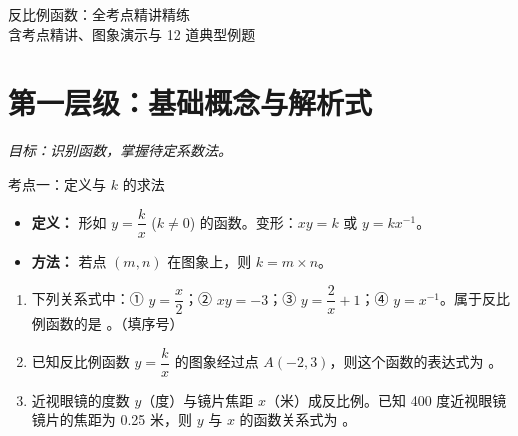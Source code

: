 \documentclass[12pt, a4paper]{article}
\begin{document}
\begin{center}
    { \heiti 反比例函数：全考点精讲精练} \\
    \vspace{0.1cm}
    {\large \kaishu 含考点精讲、图象演示与 12 道典型例题}
\end{center}

\vspace{0.1cm}

\section{第一层级：基础概念与解析式}
\textit{目标：识别函数，掌握待定系数法。}

\begin{conceptbox}{考点一：定义与 $k$ 的求法}
    \begin{itemize}
        \item \textbf{定义：} 形如 $y = \dfrac{k}{x}$ ($k \neq 0$) 的函数。变形：$xy = k$ 或 $y = kx^{-1}$。
        \item \textbf{方法：} 若点 $(m, n)$ 在图象上，则 $k = m \times n$。
    \end{itemize}
\end{conceptbox}

\begin{examplebox}
    \begin{enumerate}[label=\textbf{例\arabic*.}]
        \item 下列关系式中：① $y = \dfrac{x}{2}$；② $xy = -3$；③ $y = \dfrac{2}{x} + 1$；④ $y = x^{-1}$。属于反比例函数的是 \underline{\hspace{2cm}}。（填序号）
        
        \item 已知反比例函数 $y = \dfrac{k}{x}$ 的图象经过点 $A(-2, 3)$，则这个函数的表达式为 \underline{\hspace{2cm}}。
        
        \item 近视眼镜的度数 $y$（度）与镜片焦距 $x$（米）成反比例。已知 400 度近视眼镜镜片的焦距为 0.25 米，则 $y$ 与 $x$ 的函数关系式为 \underline{\hspace{2cm}}。
    \end{enumerate}
\end{examplebox}
\end{document}
